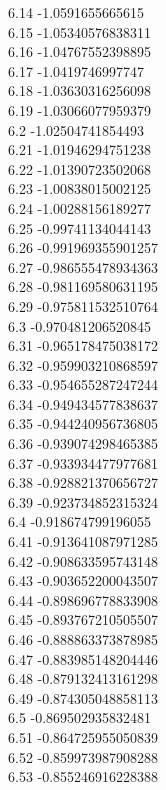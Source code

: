 {6.14	-1.0591655665615\\
6.15	-1.05340576838311\\
6.16	-1.04767552398895\\
6.17	-1.0419746997747\\
6.18	-1.03630316256098\\
6.19	-1.03066077959379\\
6.2	-1.02504741854493\\
6.21	-1.01946294751238\\
6.22	-1.01390723502068\\
6.23	-1.00838015002125\\
6.24	-1.00288156189277\\
6.25	-0.99741134044143\\
6.26	-0.991969355901257\\
6.27	-0.986555478934363\\
6.28	-0.981169580631195\\
6.29	-0.975811532510764\\
6.3	-0.970481206520845\\
6.31	-0.965178475038172\\
6.32	-0.959903210868597\\
6.33	-0.954655287247244\\
6.34	-0.949434577838637\\
6.35	-0.944240956736805\\
6.36	-0.939074298465385\\
6.37	-0.933934477977681\\
6.38	-0.928821370656727\\
6.39	-0.923734852315324\\
6.4	-0.918674799196055\\
6.41	-0.913641087971285\\
6.42	-0.908633595743148\\
6.43	-0.903652200043507\\
6.44	-0.898696778833908\\
6.45	-0.893767210505507\\
6.46	-0.888863373878985\\
6.47	-0.883985148204446\\
6.48	-0.879132413161298\\
6.49	-0.874305048858113\\
6.5	-0.869502935832481\\
6.51	-0.864725955050839\\
6.52	-0.859973987908288\\
6.53	-0.855246916228388\\
}
